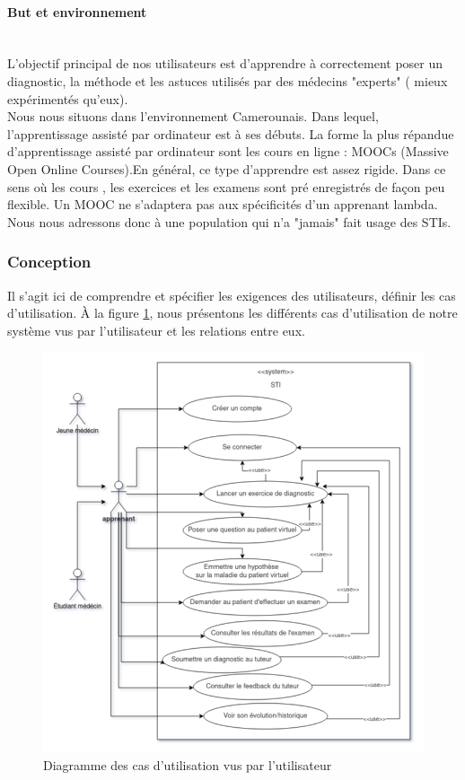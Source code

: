     \paragraph{But et environnement} \hfill \\
    L'objectif principal de nos utilisateurs est d'apprendre à correctement poser un diagnostic, la méthode et les astuces utilisés par des médecins "experts" ( mieux expérimentés qu'eux). \\
    Nous nous situons dans l'environnement Camerounais. Dans lequel, l'apprentissage assisté par ordinateur est à ses débuts. La forme la plus répandue d'apprentissage assisté par ordinateur sont les cours en ligne : MOOCs (Massive Open Online Courses).En général, ce type d'apprendre est assez rigide. Dans ce sens où les cours , les exercices et les examens sont pré enregistrés de façon peu flexible. Un MOOC ne s'adaptera pas aux spécificités d'un apprenant lambda. Nous nous adressons donc à une population qui n'a "jamais" fait usage des STIs.
    
    \subsubsection{Conception}
    Il s'agit ici de comprendre et spécifier les exigences des utilisateurs, définir les cas d'utilisation.
    À la figure \ref{fig:use_case_user}, nous présentons les différents cas d'utilisation de notre système vus par l'utilisateur et les relations entre eux.
    
    \begin{figure}[H]
        \centering
        \includegraphics[width=\textwidth]{figures/context-Use case Diagram.png}
        \captionsetup{justification=centering}
        \caption{Diagramme des cas d'utilisation vus par l'utilisateur}
        \label{fig:use_case_user}
    \end{figure}
